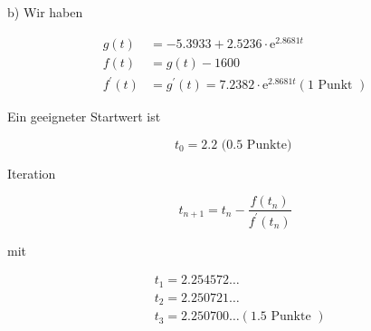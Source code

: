 \documentclass[10pt]{article}
\begin{document}
b) Wir haben

$$
\begin{aligned}
g(t) & =-5.3933+2.5236 \cdot \mathrm{e}^{2.8681 t} \\
f(t) & =g(t)-1600 \\
f^{\prime}(t) & =g^{\prime}(t)=7.2382 \cdot \mathrm{e}^{2.8681 t}(1 \text { Punkt })
\end{aligned}
$$

Ein geeigneter Startwert ist

$$
t_{0}=2.2 \text { (0.5 Punkte) }
$$

Iteration

$$
t_{n+1}=t_{n}-\frac{f\left(t_{n}\right)}{f^{\prime}\left(t_{n}\right)}
$$

mit

$$
\begin{aligned}
& t_{1}=2.254572 \ldots \\
& t_{2}=2.250721 \ldots \\
& t_{3}=2.250700 \ldots(1.5 \text { Punkte })
\end{aligned}
$$
\end{document}
